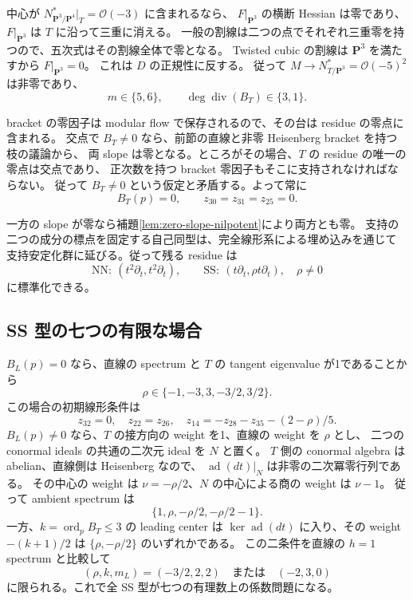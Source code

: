 \documentclass[11pt,a4paper]{ltjsarticle}
\newcommand{\PP}{\mathbf P}\renewcommand{\AA}{\mathbf A}
\newcommand{\OO}{\mathcal O}\newcommand{\FF}{\mathcal F}
\theoremstyle{remark}\newtheorem{remark}[theorem]{注意}
\begin{document}
中心が $N^*_{\PP^3/\PP^4}|_T=\OO(-3)$ に含まれるなら、
$F|_{\PP^3}$ の横断 Hessian は零であり、$F|_{\PP^3}$ は $T$ に沿って三重に消える。
一般の割線は二つの点でそれぞれ三重零を持つので、五次式はその割線全体で零となる。
Twisted cubic の割線は $\PP^3$ を満たすから $F|_{\PP^3}=0$。
これは $D$ の正規性に反する。
従って $M\to N^*_{T/\PP^3}=\OO(-5)^2$ は非零であり、
\begin{equation}\label{eq:tc-center-degrees}
 m\in\{5,6\},\qquad \deg\operatorname{div}(B_T)\in\{3,1\}.
\end{equation}

bracket の零因子は modular flow で保存されるので、その台は residue の零点に含まれる。
交点で $B_T\ne0$ なら、前節の直線と非零 Heisenberg bracket を持つ枝の議論から、
両 slope は零となる。ところがその場合、$T$ の residue の唯一の零点は交点であり、
正次数を持つ bracket 零因子もそこに支持されなければならない。
従って $B_T\ne0$ という仮定と矛盾する。よって常に
\[
 B_T(p)=0,\qquad z_{30}=z_{31}=z_{25}=0.
\]

一方の slope が零なら補題\ref{lem:zero-slope-nilpotent}により両方とも零。
支持の二つの成分の標点を固定する自己同型は、完全線形系による埋め込みを通じて
支持安定化群に延びる。従って残る residue は
\[
 \mathrm{NN}:\ (t^2\partial_t,t^2\partial_t),\qquad
 \mathrm{SS}:\ (t\partial_t,\rho t\partial_t),\quad\rho\ne0
\]
に標準化できる。

\subsection{SS 型の七つの有限な場合}
$B_L(p)=0$ なら、直線の spectrum と $T$ の tangent eigenvalue が1であることから
\[
 \rho\in\{-1,-3,3,-3/2,3/2\}.
\]
この場合の初期線形条件は
\[
 z_{32}=0,\quad z_{22}=z_{26},\quad
 z_{14}=-z_{28}-z_{35}-(2-\rho)/5.
\]
$B_L(p)\ne0$ なら、$T$ の接方向の weight を1、直線の weight を $\rho$ とし、
二つの conormal ideals の共通の二次元 ideal を $N$ と置く。
$T$ 側の conormal algebra は abelian、直線側は Heisenberg なので、
$\operatorname{ad}(dt)|_N$ は非零の二次冪零行列である。
その中心の weight は $\nu=-\rho/2$、$N$ の中心による商の weight は $\nu-1$。
従って ambient spectrum は
\[
 \{1,\rho,-\rho/2,-\rho/2-1\}.
\]
一方、$k=\operatorname{ord}_p B_T\le3$ の leading center は
$\ker\operatorname{ad}(dt)$ に入り、その weight $-(k+1)/2$ は
$\{\rho,-\rho/2\}$ のいずれかである。
この二条件を直線の $h=1$ spectrum と比較して
\[
 (\rho,k,m_L)=(-3/2,2,2)\quad\text{または}\quad(-2,3,0)
\]
に限られる。これで全 SS 型が七つの有理数上の係数問題になる。
\end{document}
